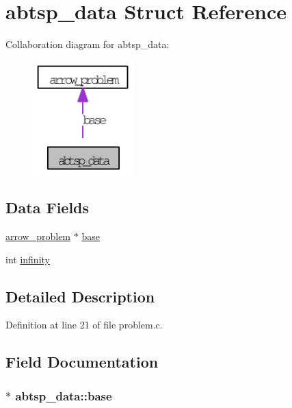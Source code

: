 \hypertarget{structabtsp__data}{
\section{abtsp\_\-data Struct Reference}
\label{structabtsp__data}
}
Collaboration diagram for abtsp\_\-data:\nopagebreak
\begin{figure}[H]
\begin{center}
\leavevmode
\includegraphics[width=110pt]{structabtsp__data__coll__graph}
\end{center}
\end{figure}
\subsection*{Data Fields}
\begin{CompactItemize}
\item 
\hyperlink{structarrow__problem}{arrow\_\-problem} $\ast$ \hyperlink{structabtsp__data_3c0a1b244d72169be516e47dd9138072}{base}
\item 
int \hyperlink{structabtsp__data_574a2f0aaf850223729244a9d2a0a4a5}{infinity}
\end{CompactItemize}


\subsection{Detailed Description}


Definition at line 21 of file problem.c.

\subsection{Field Documentation}
\hypertarget{structabtsp__data_3c0a1b244d72169be516e47dd9138072}{
\subsubsection[{base}]{$\ast$ {\bf abtsp\_\-data::base}}}
\label{structabtsp__data_3c0a1b244d72169be516e47dd9138072}


